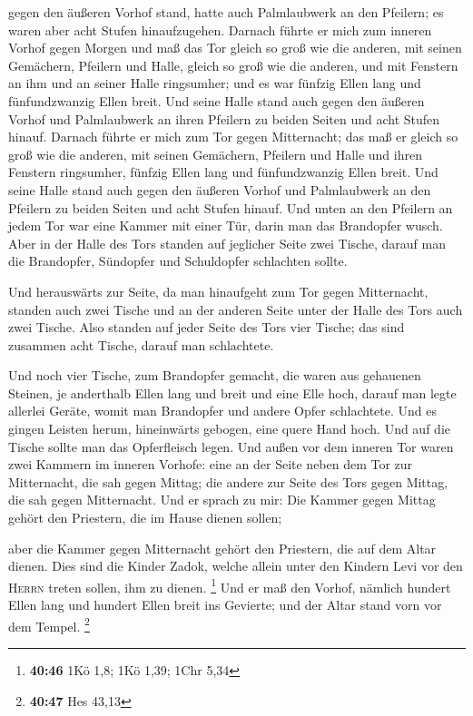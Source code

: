 gegen den äußeren Vorhof stand, hatte auch Palmlaubwerk an den Pfeilern;
es waren aber acht Stufen hinaufzugehen.  Darnach führte
er mich zum inneren Vorhof gegen Morgen und maß das Tor gleich so groß
wie die anderen,  mit seinen Gemächern, Pfeilern und
Halle, gleich so groß wie die anderen, und mit Fenstern an ihm und an
seiner Halle ringsumher; und es war fünfzig Ellen lang und
fünfundzwanzig Ellen breit.  Und seine Halle stand auch
gegen den äußeren Vorhof und Palmlaubwerk an ihren Pfeilern zu beiden
Seiten und acht Stufen hinauf.  Darnach führte er mich
zum Tor gegen Mitternacht; das maß er gleich so groß wie die anderen,
 mit seinen Gemächern, Pfeilern und Halle und ihren
Fenstern ringsumher, fünfzig Ellen lang und fünfundzwanzig Ellen breit.
 Und seine Halle stand auch gegen den äußeren Vorhof und
Palmlaubwerk an den Pfeilern zu beiden Seiten und acht Stufen hinauf.
 Und unten an den Pfeilern an jedem Tor war eine Kammer
mit einer Tür, darin man das Brandopfer wusch.  Aber in
der Halle des Tors standen auf jeglicher Seite zwei Tische, darauf man
die Brandopfer, Sündopfer und Schuldopfer schlachten sollte.

 Und herauswärts zur Seite, da man hinaufgeht zum Tor
gegen Mitternacht, standen auch zwei Tische und an der anderen Seite
unter der Halle des Tors auch zwei Tische.  Also standen
auf jeder Seite des Tors vier Tische; das sind zusammen acht Tische,
darauf man schlachtete.

 Und noch vier Tische, zum Brandopfer gemacht, die waren
aus gehauenen Steinen, je anderthalb Ellen lang und breit und eine Elle
hoch, darauf man legte allerlei Geräte, womit man Brandopfer und andere
Opfer schlachtete.  Und es gingen Leisten herum,
hineinwärts gebogen, eine quere Hand hoch. Und auf die Tische sollte man
das Opferfleisch legen.  Und außen vor dem inneren Tor
waren zwei Kammern im inneren Vorhofe: eine an der Seite neben dem Tor
zur Mitternacht, die sah gegen Mittag; die andere zur Seite des Tors
gegen Mittag, die sah gegen Mitternacht.  Und er sprach
zu mir: Die Kammer gegen Mittag gehört den Priestern, die im Hause
dienen sollen;

 aber die Kammer gegen Mitternacht gehört den Priestern,
die auf dem Altar dienen. Dies sind die Kinder Zadok, welche allein
unter den Kindern Levi vor den \textsc{Herrn} treten sollen, ihm zu
dienen. \footnote{\textbf{40:46} 1Kö 1,8; 1Kö 1,39; 1Chr 5,34}
 Und er maß den Vorhof, nämlich hundert Ellen lang und
hundert Ellen breit ins Gevierte; und der Altar stand vorn vor dem
Tempel. \footnote{\textbf{40:47} Hes 43,13}

